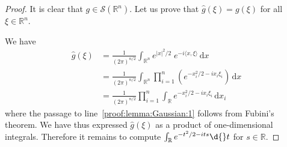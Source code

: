 \documentclass[12pt, oneside, a4paper]{article}
\theoremstyle{dfn}
\newcommand{\scalprod}[2]{\langle #1,#2 \rangle}
\def \S {\ensuremath{\mathcal{S}}}
\def \S {\ensuremath{\mathcal{S}}}
\def\Rbb{\ensuremath{\mathbb{R}}}
\def\dx{\,\mathrm dx}
\providecommand{\abs}[1]{\lvert#1\rvert}
\begin{document}
\begin{proof}
It is clear that $g \in \S(\Rbb^n)$. Let us prove that $\widehat{g}(\xi) = g(\xi)$ for all $\xi \in \Rbb^n$.

We have
\begin{align}
	\widehat{g}(\xi)
	&= \frac{1}{(2\pi)^{n/2}} \int_{\Rbb^n} e^{\abs{x}^2/2} \; e^{-i\scalprod{x}{\xi}} \dx \nonumber \\
	&= \frac{1}{(2\pi)^{n/2}} \int_{\Rbb^n} \prod_{i = 1}^n \left( e^{-x^2_i / 2 - ix_i \xi_i} \right) \dx \nonumber \\
	&= \frac{1}{(2\pi)^{n/2}} \prod_{i = 1}^n \int_{\Rbb} e^{-x^2_i / 2 - ix_i \xi_i} \dx_i \label{proof:lemma:Gaussian:1}
\end{align}
where the passage to line~\eqref{proof:lemma:Gaussian:1} follows from Fubini's theorem. We have thus expressed $\widehat{g}(\xi)$ as a product of one-dimensional integrals. Therefore it remains to compute
$
\int_\Rbb e^{-t^2 / 2 - its} \d{}t
$
for $s \in \Rbb$.


\end{proof}
\end{document}
